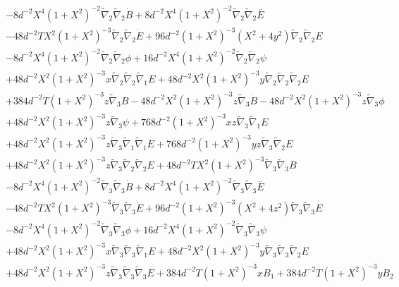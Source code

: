 \documentclass[10pt,letterpaper]{article}
\numberwithin{equation}{section}
\begin{document}
\begin{appendices}
\begin{eqnarray}
&& - 8 d^{-2} X^4 (1 + X^2)^{-2} \tilde{\nabla}_{2}\tilde{\nabla}_{2}\dot{B} + 8 d^{-2} X^4 (1 + X^2)^{-2} \tilde{\nabla}_{2}\tilde{\nabla}_{2}\overset{..}{E} \nonumber \\ 
&& - 48 d^{-2} T X^2 (1 + X^2)^{-3} \tilde{\nabla}_{2}\tilde{\nabla}_{2}\dot{E} + 96 d^{-2} (1 + X^2)^{-3} (X^2 + 4 y^2) \tilde{\nabla}_{2}\tilde{\nabla}_{2}E \nonumber \\ 
&& - 8 d^{-2} X^4 (1 + X^2)^{-2} \tilde{\nabla}_{2}\tilde{\nabla}_{2}\phi + 16 d^{-2} X^4 (1 + X^2)^{-2} \tilde{\nabla}_{2}\tilde{\nabla}_{2}\psi \nonumber \\ 
&& + 48 d^{-2} X^2 (1 + X^2)^{-3} x \tilde{\nabla}_{2}\tilde{\nabla}_{2}\tilde{\nabla}_{1}E + 48 d^{-2} X^2 (1 + X^2)^{-3} y \tilde{\nabla}_{2}\tilde{\nabla}_{2}\tilde{\nabla}_{2}E \nonumber \\ 
&& + 384 d^{-2} T (1 + X^2)^{-3} z \tilde{\nabla}_{3}B - 48 d^{-2} X^2 (1 + X^2)^{-3} z \tilde{\nabla}_{3}\dot{B} - 48 d^{-2} X^2 (1 + X^2)^{-3} z \tilde{\nabla}_{3}\phi \nonumber \\ 
&& + 48 d^{-2} X^2 (1 + X^2)^{-3} z \tilde{\nabla}_{3}\psi + 768 d^{-2} (1 + X^2)^{-3} x z \tilde{\nabla}_{3}\tilde{\nabla}_{1}E \nonumber \\ 
&& + 48 d^{-2} X^2 (1 + X^2)^{-3} z \tilde{\nabla}_{3}\tilde{\nabla}_{1}\tilde{\nabla}_{1}E + 768 d^{-2} (1 + X^2)^{-3} y z \tilde{\nabla}_{3}\tilde{\nabla}_{2}E \nonumber \\ 
&& + 48 d^{-2} X^2 (1 + X^2)^{-3} z \tilde{\nabla}_{3}\tilde{\nabla}_{2}\tilde{\nabla}_{2}E + 48 d^{-2} T X^2 (1 + X^2)^{-3} \tilde{\nabla}_{3}\tilde{\nabla}_{3}B \nonumber \\ 
&& - 8 d^{-2} X^4 (1 + X^2)^{-2} \tilde{\nabla}_{3}\tilde{\nabla}_{3}\dot{B} + 8 d^{-2} X^4 (1 + X^2)^{-2} \tilde{\nabla}_{3}\tilde{\nabla}_{3}\overset{..}{E} \nonumber \\ 
&& - 48 d^{-2} T X^2 (1 + X^2)^{-3} \tilde{\nabla}_{3}\tilde{\nabla}_{3}\dot{E} + 96 d^{-2} (1 + X^2)^{-3} (X^2 + 4 z^2) \tilde{\nabla}_{3}\tilde{\nabla}_{3}E \nonumber \\ 
&& - 8 d^{-2} X^4 (1 + X^2)^{-2} \tilde{\nabla}_{3}\tilde{\nabla}_{3}\phi + 16 d^{-2} X^4 (1 + X^2)^{-2} \tilde{\nabla}_{3}\tilde{\nabla}_{3}\psi \nonumber \\ 
&& + 48 d^{-2} X^2 (1 + X^2)^{-3} x \tilde{\nabla}_{3}\tilde{\nabla}_{3}\tilde{\nabla}_{1}E + 48 d^{-2} X^2 (1 + X^2)^{-3} y \tilde{\nabla}_{3}\tilde{\nabla}_{3}\tilde{\nabla}_{2}E \nonumber \\ 
&& + 48 d^{-2} X^2 (1 + X^2)^{-3} z \tilde{\nabla}_{3}\tilde{\nabla}_{3}\tilde{\nabla}_{3}E+384 d^{-2} T (1 + X^2)^{-3} x B_{1} + 384 d^{-2} T (1 + X^2)^{-3} y B_{2} \nonumber \\ 

\end{eqnarray}
\end{appendices}
\end{document}
